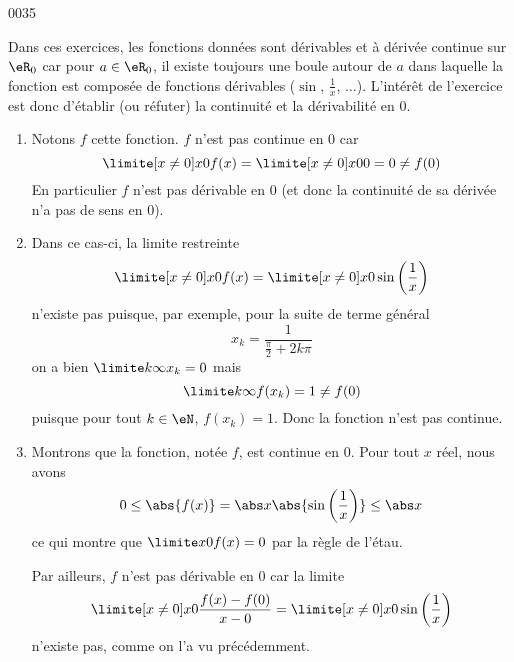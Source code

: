 
\begin{corrige}{0035}


Dans ces exercices, les fonctions données sont dérivables et à dérivée
continue sur $\eR_0$ car pour $a \in \eR_0$, il existe toujours une
boule autour de $a$ dans laquelle la fonction est composée de
fonctions dérivables ($\sin$, $\frac 1x$, $\ldots$). L'intérêt de
l'exercice est donc d'établir (ou réfuter) la continuité et la
dérivabilité en $0$.

\begin{enumerate}

\item 
 Notons $f$ cette fonction. $f$ n'est pas continue en $0$ car
\begin{equation*}
  \limite[x \neq 0] x 0 f(x) = \limite[x \neq 0] x 0 0 = 0 \neq f(0)
\end{equation*}
En particulier $f$ n'est pas dérivable en $0$ (et donc la continuité
de sa dérivée n'a pas de sens en $0$).

\item
Dans ce cas-ci, la limite \og restreinte\fg{}
\begin{equation*}
  \limite[x \neq 0] x 0 f(x) = \limite[x \neq 0] x 0 \sin\left(\frac 1 x\right)
\end{equation*}
n'existe pas puisque, par exemple, pour la suite de terme général
\begin{equation*}
  x_k = \frac 1 {\frac \pi 2 + 2k \pi}
\end{equation*}
on a bien $\limite k \infty x_k = 0$ mais
\begin{equation*}
  \limite k \infty f(x_k) = 1 \neq f(0)
\end{equation*}
puisque pour tout $k \in \eN$, $f(x_k) = 1$. Donc la fonction n'est pas continue.

\item
Montrons que la fonction, notée $f$, est continue en $0$. Pour tout $x$ réel, nous avons
\begin{equation*}
  0 \leq \abs{f(x)} = \abs x \abs{\sin \left(\frac 1 x\right)} \leq
  \abs x
\end{equation*}
ce qui montre que $\limite x 0 f(x) = 0$ par la règle de l'étau.

Par ailleurs, $f$ n'est pas dérivable en $0$ car la limite
\begin{equation*}
  \limite[x \neq 0] x 0 \frac{f(x) - f(0)}{x-0} = \limite[x\neq 0] x 0 \sin\left(\frac{1}{x}\right)
\end{equation*}
n'existe pas, comme on l'a vu précédemment.


\end{enumerate}
\end{corrige}
